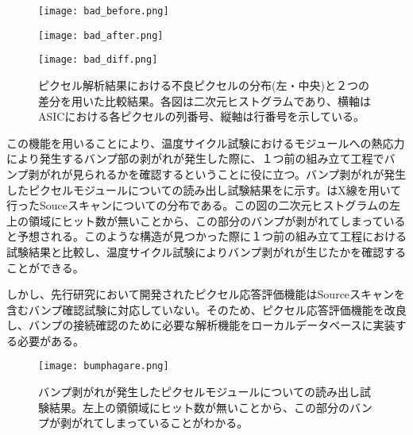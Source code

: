 \begin{figure}[tbp]
 \begin{minipage}{0.33\hsize}
  \begin{center}
   \texttt{[image: bad\_before.png]}
  \end{center}
 \end{minipage}
 \begin{minipage}{0.33\hsize}
 \begin{center}
  \texttt{[image: bad\_after.png]}
 \end{center}
 \end{minipage}
 \begin{minipage}{0.33\hsize}
 \begin{center}
  \texttt{[image: bad\_diff.png]}
 \end{center}
 \end{minipage}
 \caption{ピクセル解析結果における不良ピクセルの分布(左・中央)と２つの差分を用いた比較結果。各図は二次元ヒストグラムであり、横軸はASICにおける各ピクセルの列番号、縦軸は行番号を示している。}
 \label{fig:badpixel}
\end{figure}

この機能を用いることにより、温度サイクル試験におけるモジュールへの熱応力により発生するバンプ部の剥がれが発生した際に、１つ前の組み立て工程でバンプ剥がれが見られるかを確認するということに役に立つ。バンプ剥がれが発生したピクセルモジュールについての読み出し試験結果をに示す。はX線を用いて行ったSouceスキャンについての分布である。この図の二次元ヒストグラムの左上の領域にヒット数が無いことから、この部分のバンプが剥がれてしまっていると予想される。このような構造が見つかった際に１つ前の組み立て工程における試験結果と比較し、温度サイクル試験によりバンプ剥がれが生じたかを確認することができる。

しかし、先行研究において開発されたピクセル応答評価機能はSourceスキャンを含むバンプ確認試験に対応していない。そのため、ピクセル応答評価機能を改良し、バンプの接続確認のために必要な解析機能をローカルデータベースに実装する必要がある。


\begin{figure}[tbp]
  \centering
  \texttt{[image: bumphagare.png]}
  \caption[バンプ剥がれが発生したピクセルモジュールについての読み出し試験結果]{バンプ剥がれが発生したピクセルモジュールについての読み出し試験結果。左上の領領域にヒット数が無いことから、この部分のバンプが剥がれてしまっていることがわかる。}
  \label{fig:bumphagare}
\end{figure}



